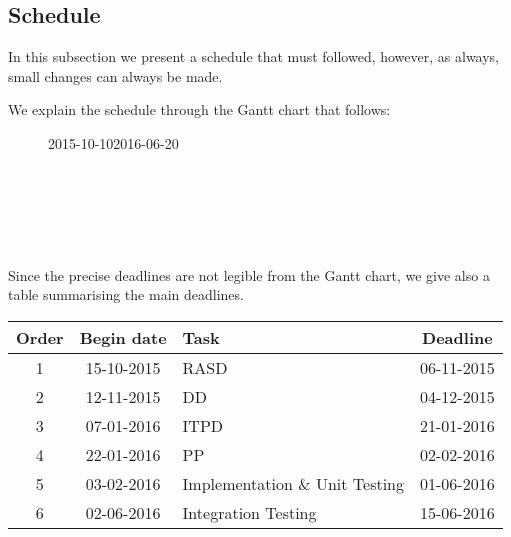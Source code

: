 \subsection{Schedule} %
\label{sub:schedule}

In this subsection we present a schedule that must followed, however, as always, small changes can always be made.

We explain the schedule through the Gantt chart that follows:

\begin{figure}[!h]
    \hspace*{-2.0cm}
    \begin{ganttchart}[
    		vgrid={*{6}{draw=none}, dotted},
    		hgrid={dotted},
    		time slot format=isodate,
			x unit=0.5mm,
			progress=today,
			progress label text={#1}\%,
	        today=2016-02-02,
	        today rule/.style= {gray!80, thick},
	        today label=Today,
	        today label/.style = {black},
	        link bulge=1, link tolerance=0,
    	]{2015-10-10}{2016-06-20}
         \\
         \\
         \\
         \\
         \\
         \\
    \end{ganttchart}
    \label{tab:gantt}
\end{figure}

Since the precise deadlines are not legible from the Gantt chart, we give also a table summarising the main deadlines.

\begin{center}
\begin{tabular}{ c|c|l|c }
	\textbf{Order} & \textbf{Begin date} & \textbf{Task} & \textbf{Deadline} \\ \hline
	1 & 15-10-2015 & RASD & 06-11-2015 \\ \hline
	2 & 12-11-2015 & DD & 04-12-2015 \\ \hline
	3 & 07-01-2016 & ITPD & 21-01-2016 \\ \hline
	4 & 22-01-2016 & PP & 02-02-2016 \\ \hline
	5 & 03-02-2016 & Implementation \& Unit Testing  & 01-06-2016 \\ \hline
	6 & 02-06-2016 & Integration Testing  & 15-06-2016 \\
\end{tabular}
\end{center}


